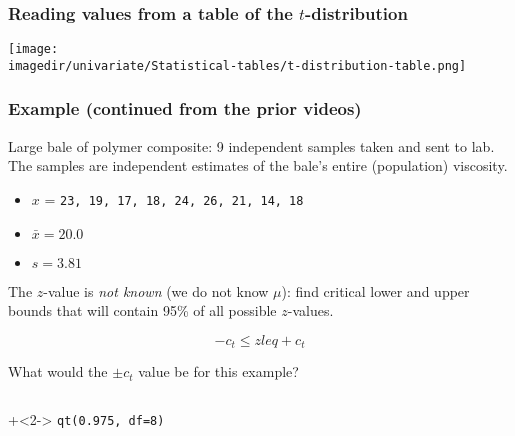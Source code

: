 \begin{frame}\frametitle{Reading values from a table of the $t$-distribution}
	\centerline{\texttt{[image: \\imagedir/univariate/Statistical-tables/t-distribution-table.png]} }
\end{frame}

\begin{frame}\frametitle{Example (continued from the prior videos)}

	Large bale of polymer composite: 9 independent samples taken and sent to lab. The samples are independent estimates of the bale's entire (population) viscosity.
	\begin{itemize}
		\item	$x$ = \texttt{23, 19, 17, 18, 24, 26, 21, 14, 18}
		\item	$\bar{x} = 20.0$
		\item	$s=3.81$
	\end{itemize}
	\myhrule
	
	The $z$-value is \emph{not known} (we do not know $\mu$): find critical lower and upper bounds that will contain 95\% of all possible $z$-values.
	
	\[-c_t \leq z leq +c_t\]
	
	What would the $\pm c_t$ value be for this example?
	
	\vspace{12pt}
	\begin{columns}[t]

			\onslide+<2->{
				\texttt{qt(0.975, df=8)}
			}
	\end{columns}
\end{frame}

